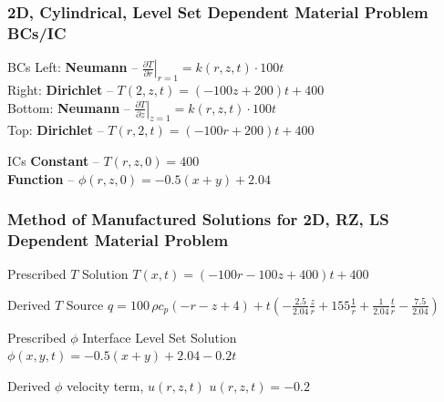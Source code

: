 \documentclass[]{beamer}
\begin{document}
\begin{frame}[t]\frametitle{2D, Cylindrical, Level Set Dependent Material Problem BCs/IC}
  \begin{block}{BCs}
    Left: \textbf{Neumann} -- $\left. \frac{\partial T}{\partial r}\right|_{r=1} = k(r,z,t)\cdot 100t$ \\
    Right: \textbf{Dirichlet} -- $T(2,z,t) = (-100z + 200)t +400$ \\
    Bottom: \textbf{Neumann} -- $\left. \frac{\partial T}{\partial z}\right|_{z=1} = k(r,z,t)\cdot 100t$ \\
    Top: \textbf{Dirichlet} -- $T(r,2,t) = (-100r + 200)t + 400$
  \end{block}
  
  \begin{block}{ICs}
    \textbf{Constant} -- $T(r,z,0) = 400$\\
    \textbf{Function} -- $\phi(r,z,0) = -0.5(x+y) + 2.04$
  \end{block}
\end{frame}

\begin{frame}[t]\frametitle{Method of Manufactured Solutions for 2D, RZ, LS Dependent Material Problem}
  \begin{block}{Prescribed $T$ Solution}
    $T(x,t) = (-100r-100z+400)t + 400$
  \end{block}
  
  \begin{block}{Derived $T$ Source}
  $q = 100\,\rho c_p \left(-r-z+4\right)+ t\left(-\frac{2.5}{2.04}\frac{z}{r} + 155\frac{1}{r}
  +\frac{1}{2.04}\frac{t}{r} - \frac{7.5}{2.04}\right)$
  \end{block}
  
  \begin{block}{Prescribed $\phi$ Interface Level Set Solution}
    $\phi(x,y,t) = -0.5(x+y) + 2.04 - 0.2t$
  \end{block}
  
  \begin{block}{Derived $\phi$ velocity term, $u(r,z,t)$}
    $u(r,z,t) = -0.2$
  \end{block}
\end{frame}

\end{document}
